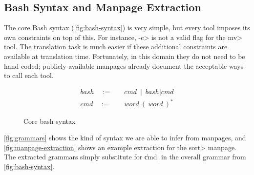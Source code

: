 \subsection{Bash Syntax and Manpage Extraction}
\label{subsec:represent}

The core Bash syntax (\autoref{fig:bash-syntax}) is very simple, but every tool imposes its own constraints on top of this. For instance, \<-c> is not a valid flag for the \<mv> tool. The translation task is much easier if these additional constraints are available at translation time. Fortunately, in this domain they do not need to be hand-coded; publicly-available manpages already document the acceptable ways to call each tool.

\begin{figure}[ht]
\begin{align*}
\mathit{bash} \quad :=& \quad \mathit{cmd} ~\mid~ \mathit{bash}|\mathit{cmd} \\
\mathit{cmd}  \quad :=& \quad \mathit{word}~(~\mathit{word}~)^{*}
\end{align*}
\vspace{-20pt}
\caption{Core bash syntax}
\label{fig:bash-syntax}
\end{figure}


\autoref{fig:grammars} shows the kind of syntax we are able to infer from
manpages, and \autoref{fig:manpage-extraction} shows an example extraction for
the \<sort> manpage. The extracted grammars simply substitute for \|cmd| in the
overall grammar from \autoref{fig:bash-syntax}.

